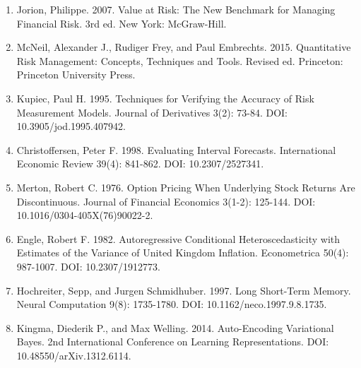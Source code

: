 \begin{enumerate}
\item Jorion, Philippe. 2007. Value at Risk: The New Benchmark for Managing Financial Risk. 3rd ed. New York: McGraw-Hill.
\item McNeil, Alexander J., Rudiger Frey, and Paul Embrechts. 2015. Quantitative Risk Management: Concepts, Techniques and Tools. Revised ed. Princeton: Princeton University Press.
\item Kupiec, Paul H. 1995. Techniques for Verifying the Accuracy of Risk Measurement Models. Journal of Derivatives 3(2): 73-84. DOI: 10.3905/jod.1995.407942.
\item Christoffersen, Peter F. 1998. Evaluating Interval Forecasts. International Economic Review 39(4): 841-862. DOI: 10.2307/2527341.
\item Merton, Robert C. 1976. Option Pricing When Underlying Stock Returns Are Discontinuous. Journal of Financial Economics 3(1-2): 125-144. DOI: 10.1016/0304-405X(76)90022-2.
\item Engle, Robert F. 1982. Autoregressive Conditional Heteroscedasticity with Estimates of the Variance of United Kingdom Inflation. Econometrica 50(4): 987-1007. DOI: 10.2307/1912773.
\item Hochreiter, Sepp, and Jurgen Schmidhuber. 1997. Long Short-Term Memory. Neural Computation 9(8): 1735-1780. DOI: 10.1162/neco.1997.9.8.1735.
\item Kingma, Diederik P., and Max Welling. 2014. Auto-Encoding Variational Bayes. 2nd International Conference on Learning Representations. DOI: 10.48550/arXiv.1312.6114.
\end{enumerate}


